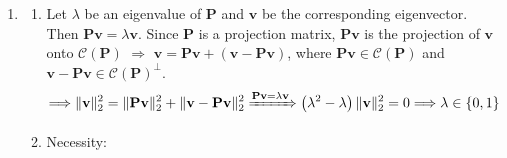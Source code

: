 \documentclass[11pt,letter,notitlepage]{article}
\DeclareMathOperator*{\argmin}{\bf argmin}
\newcommand{\proj}[2]{\textbf{P}_{#2} (#1)}
\theoremstyle{definition}
\begin{document}
\begin{solution}
\begin{enumerate}
\begin{enumerate}
\[\begin{matrix}
			1 & 0\\
			0 & 1
		\end{matrix}
		\right]
		\Longrightarrow
		\mathbf{x}
		\in
		\mathcal{C}(\mathbf{A}) = \mathbb{R}^2
		\Longrightarrow
		\proj{\mathbf{x}}{\mathbf{A}} 
		= 
		\mathbf{x}
		=
		\mathbf{A}
		\cdot
		\mathbf{x}
		\]
		The coordinates of $\mathbf{P_A}(\mathbf{x})$ with respect to the column vectors in $\mathbf{A}$ are unique and equal to $\mathbf{x}$ itself.
		\item
		\[
		\mathbf{A} = \left[
		\begin{matrix}
			1 & 2\\
			1 & 2
		\end{matrix}
		\right]
		\Longrightarrow
		\mathcal{C}(\mathbf{A}) = \{\alpha (1,1)^T : \alpha \in \mathbb{R}\}
		\]
		\[
		\proj{\mathbf{x}}{\mathbf{A}}
		=
		\argmin_{\substack{\alpha (1,1)^T \\ \alpha \in \mathbb{R}}} \Vert \mathbf{x} - \alpha (1,1)^T \Vert_2
		\]
		\[
		\xRightarrow{2.(a)}
		\proj{\mathbf{x}}{\mathbf{A}}
		=
		\frac{(1,1)\mathbf{x}}{(1,1)(1,1)^T}(1,1)^T
		=
		\frac{x_1 + x_2}{2}(1,1)^T
		=
		\mathbf{A}
		\cdot
		\left(c_1, c_2\right)^T
		\]
		$\Longrightarrow$ The set of all coordinates of $\mathbf{P_A}(\mathbf{x})$ with respect to the column vectors in $\mathbf{A}$ is the affine line:
		\[
		\left\{(c_1, c_2)^T \in \mathbb{R}^2 : c_1 + 2c_2 = \frac{x_1 + x_2}{2}\right\}
		\]
		Thus the coordinates are not unique.	
	\end{enumerate}
	\item 
	\begin{enumerate}
		\item 
		Let $\lambda$ be an eigenvalue of $\mathbf{P}$ and $\mathbf{v}$ be the corresponding eigenvector. Then $\mathbf{P}\mathbf{v} = \lambda \mathbf{v}$. Since $\mathbf{P}$ is a projection matrix, $\mathbf{P}\mathbf{v}$ is the projection of $\mathbf{v}$ onto $\mathcal{C}(\mathbf{P})$ $\Longrightarrow$ $\mathbf{v} = \mathbf{P}\mathbf{v} + \left(\mathbf{v} - \mathbf{P}\mathbf{v}\right)$, where $\mathbf{P}\mathbf{v} \in \mathcal{C}(\mathbf{P})$ and $\mathbf{v} - \mathbf{P}\mathbf{v} \in \mathcal{C}(\mathbf{P})^{\perp}$.
		\[
		\Longrightarrow
		\Vert \mathbf{v} \Vert_2^2
		=
		\Vert \mathbf{Pv} \Vert_2^2
		+
		\Vert \mathbf{v} - \mathbf{Pv} \Vert_2^2
		\xRightarrow{\mathbf{Pv} = \lambda \mathbf{v}}
		\left(\lambda^2-\lambda\right)\Vert \mathbf{v} \Vert_2^2
		=
		0
		\Longrightarrow
		\lambda \in \{0, 1\}
		\]
		\item
		 Necessity:


\end{enumerate}
\end{enumerate}
\end{solution}
\end{document}
